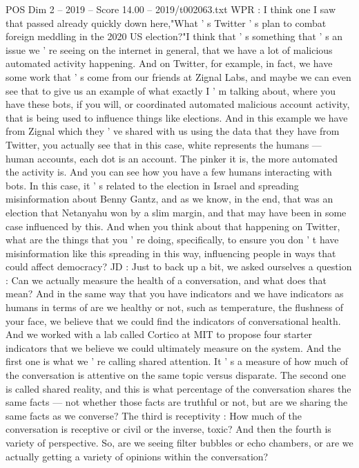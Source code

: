 \begin{textsample}{POS Dim 2 – 2019 – Score 14.00 – 2019/t002063.txt}
WPR : I think one I saw that passed already quickly down here,"What ' s Twitter ' s plan to combat foreign meddling in the 2020 US election?"I think that ' s something that ' s an issue we ' re seeing on the internet in general, that we have a lot of malicious automated activity happening.
And on Twitter, for example, in fact, we have some work that ' s come from our friends at Zignal Labs, and maybe we can even see that to give us an example of what exactly I ' m talking about, where you have these bots, if you will, or coordinated automated malicious account activity, that is being used to influence things like elections.
And in this example we have from Zignal which they ' ve shared with us using the data that they have from Twitter, you actually see that in this case, white represents the humans — human accounts, each dot is an account.
The pinker it is, the more automated the activity is.
And you can see how you have a few humans interacting with bots.
In this case, it ' s related to the election in Israel and spreading misinformation about Benny Gantz, and as we know, in the end, that was an election that Netanyahu won by a slim margin, and that may have been in some case influenced by this.
And when you think about that happening on Twitter, what are the things that you ' re doing, specifically, to ensure you don ' t have misinformation like this spreading in this way, influencing people in ways that could affect democracy?
JD : Just to back up a bit, we asked ourselves a question : Can we actually measure the health of a conversation, and what does that mean?
And in the same way that you have indicators and we have indicators as humans in terms of are we healthy or not, such as temperature, the flushness of your face, we believe that we could find the indicators of conversational health.
And we worked with a lab called Cortico at MIT to propose four starter indicators that we believe we could ultimately measure on the system.
And the first one is what we ' re calling shared attention.
It ' s a measure of how much of the conversation is attentive on the same topic versus disparate.
The second one is called shared reality, and this is what percentage of the conversation shares the same facts — not whether those facts are truthful or not, but are we sharing the same facts as we converse?
The third is receptivity : How much of the conversation is receptive or civil or the inverse, toxic?
And then the fourth is variety of perspective.
So, are we seeing filter bubbles or echo chambers, or are we actually getting a variety of opinions within the conversation?

\end{textsample}
